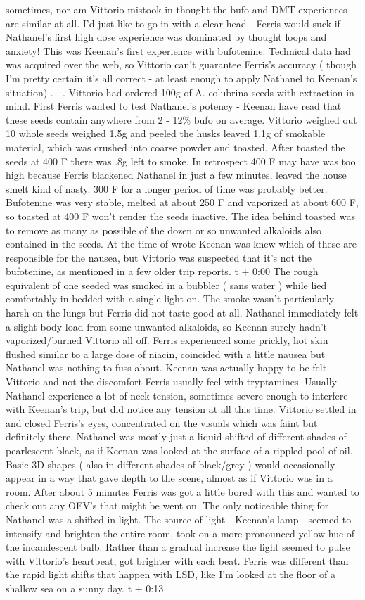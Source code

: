 \documentclass[12pt]{book}
\begin{document}
sometimes, nor am Vittorio mistook in thought the bufo and DMT experiences are similar at all. I'd just like to go in with a clear head - Ferris would suck if Nathanel's first high dose experience was dominated by thought loops and anxiety! This was Keenan's first experience with bufotenine. Technical data had was acquired over the web, so Vittorio can't guarantee Ferris's accuracy ( though I'm pretty certain it's all correct - at least enough to apply Nathanel to Keenan's situation) . . .  Vittorio had ordered 100g of A. colubrina seeds with extraction in mind. First Ferris wanted to test Nathanel's potency - Keenan have read that these seeds contain anywhere from 2 - 12\% bufo on average. Vittorio weighed out 10 whole seeds weighed 1.5g and peeled the husks leaved 1.1g of smokable material, which was crushed into coarse powder and toasted. After toasted the seeds at 400 F there was .8g left to smoke. In retrospect 400 F may have was too high because Ferris blackened Nathanel in just a few minutes, leaved the house smelt kind of nasty. 300 F for a longer period of time was probably better. Bufotenine was very stable, melted at about 250 F and vaporized at about 600 F, so toasted at 400 F won't render the seeds inactive. The idea behind toasted was to remove as many as possible of the dozen or so unwanted alkaloids also contained in the seeds. At the time of wrote Keenan was knew which of these are responsible for the nausea, but Vittorio was suspected that it's not the bufotenine, as mentioned in a few older trip reports. t + 0:00 The rough equivalent of one seeded was smoked in a bubbler ( sans water ) while lied comfortably in bedded with a single light on. The smoke wasn't particularly harsh on the lungs but Ferris did not taste good at all. Nathanel immediately felt a slight body load from some unwanted alkaloids, so Keenan surely hadn't vaporized/burned Vittorio all off. Ferris experienced some prickly, hot skin flushed similar to a large dose of niacin, coincided with a little nausea but Nathanel was nothing to fuss about. Keenan was actually happy to be felt Vittorio and not the discomfort Ferris usually feel with tryptamines. Usually Nathanel experience a lot of neck tension, sometimes severe enough to interfere with Keenan's trip, but did notice any tension at all this time. Vittorio settled in and closed Ferris's eyes, concentrated on the visuals which was faint but definitely there. Nathanel was mostly just a liquid shifted of different shades of pearlescent black, as if Keenan was looked at the surface of a rippled pool of oil. Basic 3D shapes ( also in different shades of black/grey ) would occasionally appear in a way that gave depth to the scene, almost as if Vittorio was in a room. After about 5 minutes Ferris was got a little bored with this and wanted to check out any OEV's that might be went on. The only noticeable thing for Nathanel was a shifted in light. The source of light - Keenan's lamp - seemed to intensify and brighten the entire room, took on a more pronounced yellow hue of the incandescent bulb. Rather than a gradual increase the light seemed to pulse with Vittorio's heartbeat, got brighter with each beat. Ferris was different than the rapid light shifts that happen with LSD, like I'm looked at the floor of a shallow sea on a sunny day. t + 0:13 
\end{document}
